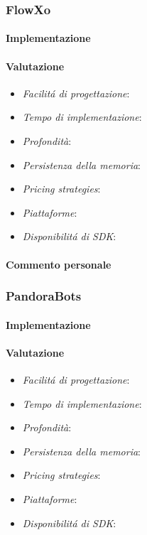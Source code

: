 \documentclass[]{article}
\begin{document}
\subsubsection{FlowXo}
\paragraph{Implementazione}
\paragraph{Valutazione}
\begin{itemize}
\item \textit{Facilitá di progettazione}: 
\item \textit{Tempo di implementazione}: 
\item \textit{Profondità}: 
\item \textit{Persistenza della memoria}: 
\item \textit{Pricing strategies}: 
\item \textit{Piattaforme}: 
\item \textit{Disponibilitá di SDK}: 
\end{itemize}
\paragraph{Commento personale}

\subsubsection{PandoraBots}
\paragraph{Implementazione}
\paragraph{Valutazione}
\begin{itemize}
\item \textit{Facilitá di progettazione}: 
\item \textit{Tempo di implementazione}: 
\item \textit{Profondità}: 
\item \textit{Persistenza della memoria}: 
\item \textit{Pricing strategies}: 
\item \textit{Piattaforme}: 
\item \textit{Disponibilitá di SDK}: 
\end{itemize}
\end{document}
